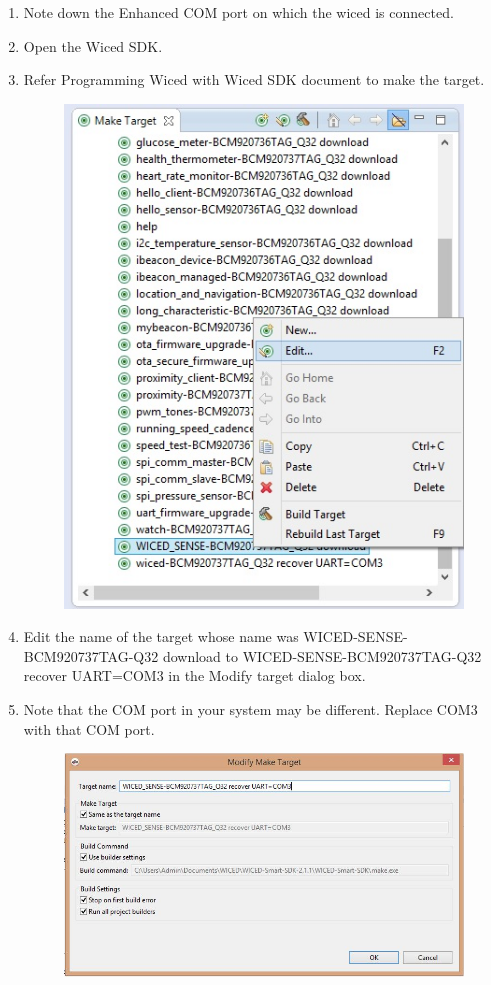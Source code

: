 \documentclass[11pt,a4paper]{article}
\begin{document}
\begin{enumerate}
	  \item Note down the Enhanced COM port on which the wiced is connected.
    \item Open the Wiced SDK.
	\item Refer Programming Wiced with Wiced SDK document to make the target.
	
	\newpage
	 \begin{figure}[h]
        \centering
    	\includegraphics[scale=0.5]{edit1.jpg}
    	\caption{}
	    \end{figure}
    \item Edit the name of the target whose name was WICED-SENSE-BCM920737TAG-Q32 download to WICED-SENSE-BCM920737TAG-Q32 recover UART=COM3 in the Modify target dialog box.
    \item Note that the COM port in your system may be different. Replace COM3 with that COM port.
     \begin{figure}[h]
        \centering
    	\includegraphics[scale=0.5]{edit.JPG}
    	\caption{}
	    \end{figure}
	    

\end{enumerate}
\end{document}
